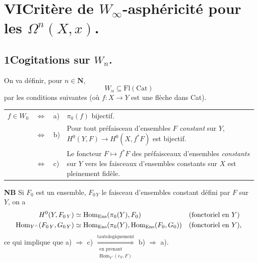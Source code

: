 \dgrchunkbegin





\section*{VI\quad Critère de $W_\infty$-asphéricité pour les $\Omega^n(X,x)$.}

\subsection*{1\quad Cogitations sur $W_n$.}

On va définir, pour $n \in \mathbf{N}$,
\[
W_n \subseteq \mathrm{Fl}(\mathrm{Cat})
\]
par les conditions suivantes (où $f : X \longrightarrow Y$ est une flèche dans Cat).

\noindent\begin{tabular}{@{}l c l >{\RaggedRight\arraybackslash}p{}@{}}
$f \in W_0$ & $\Longleftrightarrow$ & a) & $\pi_0(f)$ bijectif.\\
 & $\Longleftrightarrow$ & b) & Pour tout préfaisceau d'ensembles $F$ \textit{constant} sur $Y$, $H^0(Y,F) \longrightarrow H^0(X,f^*F)$ est bijectif.\\
 & $\Longleftrightarrow$ & c) & Le foncteur $F \longmapsto f^*F$ des préfaisceaux d'ensembles \textit{constants} sur $Y$ vers les faisceaux d'ensembles constants sur $X$ est pleinement fidèle.
\end{tabular}



\textbf{NB} Si $F_0$ est un ensemble, $F_{0\,Y}$ le faisceau d'ensembles constant défini par $F$ sur $Y$, on a
\[
\begin{aligned}
H^0(Y,F_{0\,Y}) &\simeq \mathrm{Hom}_{\mathrm{Ens}}(\pi_0(Y),F_0) && \text{(fonctoriel en $Y$)}\\
\mathrm{Hom}_{Y^\wedge}(F_{0\,Y},G_{0\,Y}) &\simeq \mathrm{Hom}_{\mathrm{Ens}}(\pi_0(Y),\mathrm{Hom}_{\mathrm{Ens}}(F_0,G_0)) && \text{(fonctoriel en $Y$),}
\end{aligned}
\]
ce qui implique que a) $\Longrightarrow$ c) $\underset{\substack{\text{en prenant}\\ \mathrm{Hom}_{Y^\wedge}(e_Y,F)}}{\overset{\text{tautologiquement}}{\Longrightarrow}}$ b) $\Longrightarrow$ a).

